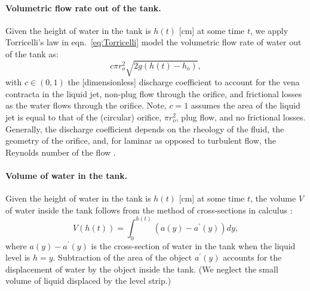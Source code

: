 \documentclass[openacc]{rsproca_new}%
\begin{document}
\paragraph{Volumetric flow rate out of the tank.} Given the height of water in the tank is $h(t)$ [cm] at some time $t$, we apply Torricelli's law in eqn.~\ref{eq:Torricelli} model the volumetric flow rate of water out of the tank as:
\begin{equation}
	c \pi r_o^2 \sqrt{2 g(h(t)-h_o)}, \label{eq:outletflow}
\end{equation}
with $c\in(0,1)$ the [dimensionless] discharge coefficient to account for the vena contracta in the liquid jet, non-plug flow through the orifice, and frictional losses as the water flows through the orifice. 
Note, $c=1$ assumes the area of the liquid jet is equal to that of the (circular) orifice, $\pi r_o^2$, plug flow, and no frictional losses.
Generally, the discharge coefficient depends on the rheology of the fluid, the geometry of the orifice, and, for laminar as opposed to turbulent flow, the Reynolds number of the flow \cite{teoman2022discharge}. 
\cite{horsch2020simple,teoman2022discharge,hicks2014determining,blasone2015discharge,lienhard1984velocity,wadhwa2021study}

\paragraph{Volume of water in the tank.} Given the height of water in the tank is $h(t)$ [cm] at some time $t$, the volume $V$ of water inside the tank follows from the method of cross-sections in calculus \cite{debook}:
\begin{equation}
	V(h(t))=\int_0^{h(t)} \left( a(y) - a^\prime(y) \right) dy, \label{eq:volume}
\end{equation}
where $a(y)-a^\prime(y)$ is the cross-section of water in the tank when the liquid level is $h=y$. Subtraction of the area of the object $a^\prime(y)$ accounts for the displacement of water by the object inside the tank. 
(We neglect the small volume of liquid displaced by the level strip.)
\end{document}
